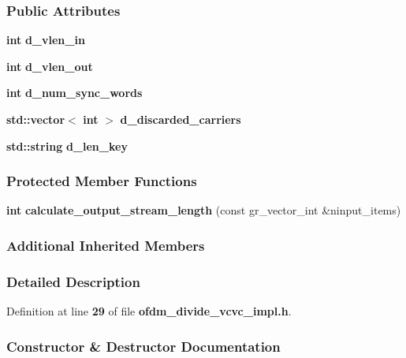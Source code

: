 \subsubsection*{Public Attributes}
\begin{DoxyCompactItemize}
\item 
{\bf int} {\bf d\+\_\+vlen\+\_\+in}
\item 
{\bf int} {\bf d\+\_\+vlen\+\_\+out}
\item 
{\bf int} {\bf d\+\_\+num\+\_\+sync\+\_\+words}
\item 
{\bf std\+::vector}$<$ {\bf int} $>$ {\bf d\+\_\+discarded\+\_\+carriers}
\item 
{\bf std\+::string} {\bf d\+\_\+len\+\_\+key}
\end{DoxyCompactItemize}
\subsubsection*{Protected Member Functions}
\begin{DoxyCompactItemize}
\item 
{\bf int} {\bf calculate\+\_\+output\+\_\+stream\+\_\+length} (const gr\+\_\+vector\+\_\+int \&ninput\+\_\+items)
\end{DoxyCompactItemize}
\subsubsection*{Additional Inherited Members}


\subsubsection{Detailed Description}


Definition at line {\bf 29} of file {\bf ofdm\+\_\+divide\+\_\+vcvc\+\_\+impl.\+h}.



\subsubsection{Constructor \& Destructor Documentation}
